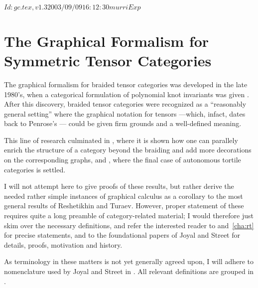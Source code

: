 \RCSID $Id: gc.tex,v 1.3 2003/09/09 16:12:30 murri Exp $


\chapter{The Graphical Formalism for Symmetric Tensor Categories}
\label{cha:gc}

The graphical formalism for braided tensor categories was developed in
the late 1980's, when a categorical formulation of polynomial knot
invariants was given \cite{freyd-yetter;btc, turaev;yang-baxter}.
After this discovery, braided tensor categories were recognized as a
``reasonably general setting'' \cite{joyal-street;tensor-calculus}
where the graphical notation for tensors ---which, infact, dates back
to Penrose's \cite{penrose;negative-dimensional-tensors}--- could be
given firm grounds and a well-defined meaning.

This line of research culminated in
\cite{joyal-street;tensor-calculus}, where it is shown how one can
parallely enrich the structure of a category beyond the braiding and
add more decorations on the corresponding graphs, and
\cite{reshetikhin-turaev;ribbon-graphs}, where the final case of
autonomous tortile categories is settled.

I will not attempt here to give proofs of these results, but rather
derive the needed rather simple instances of graphical calculus as a
corollary to the most general results of Reshetikhin and Turaev.
However, proper statement of these requires quite a long preamble of
category-related material; I would therefore just skim over the
necessary definitions, and refer the interested reader to
 and~\ref{cha:rt} for precise statements, and to the
foundational papers of Joyal and Street
\cite{joyal-street;tensor-calculus, joyal-street;btc} for details,
proofs, motivation and history.

As terminology in these matters is not yet generally agreed upon, I
will adhere to nomenclature used by Joyal and Street in
\cite{joyal-street;tensor-calculus, joyal-street;btc}. All relevant
definitions are grouped in .


